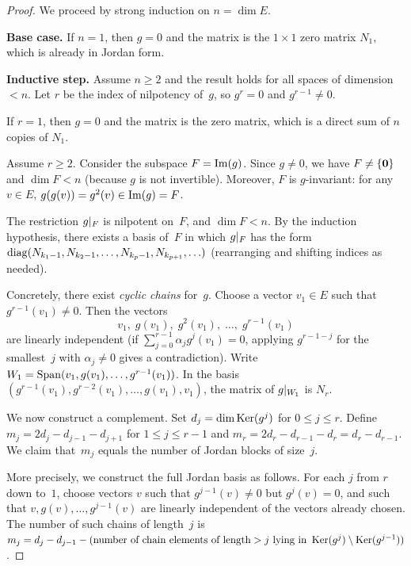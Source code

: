 \begin{proof}
We proceed by strong induction on $n = \dim E$.

\textbf{Base case.}  If $n = 1$, then $g = 0$ and the matrix is the
$1 \times 1$ zero matrix $N_1$, which is already in Jordan form.

\textbf{Inductive step.}  Assume $n \geq 2$ and the result holds for
all spaces of dimension $< n$.  Let $r$ be the index of nilpotency
of~$g$, so $g^r = 0$ and $g^{r-1} \neq 0$.

If $r = 1$, then $g = 0$ and the matrix is the zero matrix, which is
a direct sum of $n$ copies of $N_1$.

Assume $r \geq 2$.  Consider the subspace $F = \operatorname{Im}(g)$.  Since
$g \neq 0$, we have $F \neq \left\{\mathbf{0}\right\}$ and $\dim F < n$ (because
$g$ is not invertible).  Moreover, $F$ is $g$-invariant: for any
$v \in E$, $g(g(v)) = g^2(v) \in \operatorname{Im}(g) = F$.

The restriction $g{|_{F}}$ is nilpotent on~$F$, and
$\dim F < n$.  By the induction hypothesis, there exists a basis of~$F$
in which $g{|_{F}}$ has the form
$\operatorname{diag}(N_{k_1-1}, N_{k_2-1}, \ldots, N_{k_p-1}, N_{k_{p+1}}, \ldots)$
(rearranging and shifting indices as needed).

Concretely, there exist \emph{cyclic chains} for~$g$.  Choose a vector
$v_1 \in E$ such that $g^{r-1}(v_1) \neq 0$.  Then the vectors
\[
  v_1,\; g(v_1),\; g^2(v_1),\; \ldots,\; g^{r-1}(v_1)
\]
are linearly independent (if $\sum_{j=0}^{r-1} \alpha_j g^j(v_1) = 0$,
applying $g^{r-1-j}$ for the smallest~$j$ with $\alpha_j \neq 0$ gives
a contradiction).  Write $W_1 = \operatorname{Span}(v_1, g(v_1), \ldots,
g^{r-1}(v_1))$.  In the basis
$(g^{r-1}(v_1), g^{r-2}(v_1), \ldots, g(v_1), v_1)$, the matrix
of $g{|_{W_1}}$ is $N_r$.

We now construct a complement.  Set
$d_j = \dim\operatorname{Ker}(g^j)$ for $0 \leq j \leq r$.  Define
$m_j = 2d_j - d_{j-1} - d_{j+1}$ for $1 \leq j \leq r-1$ and
$m_r = 2d_r - d_{r-1} - d_r = d_r - d_{r-1}$.  We claim that~$m_j$
equals the number of Jordan blocks of size~$j$.

More precisely, we construct the full Jordan basis as follows.
For each $j$ from $r$ down to~$1$, choose vectors $v$ such that
$g^{j-1}(v) \neq 0$ but $g^{j}(v) = 0$, and such that
$v, g(v), \ldots, g^{j-1}(v)$ are linearly independent of the vectors
already chosen.  The number of such chains of length~$j$ is
$m_j = d_j - d_{j-1} - (\text{number of chain elements of length}
> j\text{ lying in }\operatorname{Ker}(g^j)\setminus\operatorname{Ker}(g^{j-1}))$.


\end{proof}
